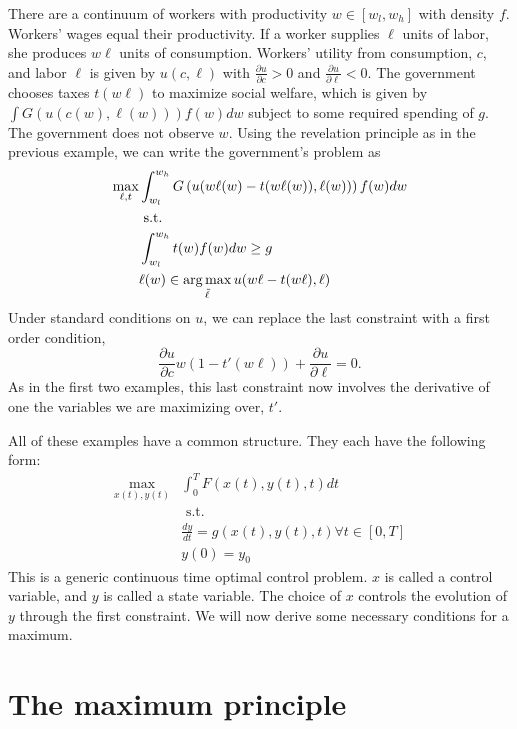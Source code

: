 \begin{example}
  There are a continuum of workers with productivity $w \in [w_l,w_h]$
  with density $f$. Workers' wages equal their productivity. If a
  worker supplies $\ell$ units of labor, she produces $w \ell$ units
  of consumption. Workers' utility from consumption, $c$, and labor
  $\ell$ is given by $u(c,\ell)$ with $\frac{\partial u}{\partial c} >
  0$ and $\frac{\partial u}{\partial \ell} < 0$. The government
  chooses taxes $t(w\ell)$ to maximize social welfare, which is given
  by $\int G(u(c(w),\ell(w))) f(w) dw$ subject to some required
  spending of $g$. The government does
  not observe $w$. Using the revelation principle as in the previous
  example, we can write the government's problem as
  \begin{align*}
    \max_{\ell,t} &  \int_{w_l}^{w_h} G\left(u(w\ell(w) - t(w\ell(w)),\ell(w))
    \right) f(w) dw \\
    & \text{ s.t. } \\
    & \int_{w_l}^{w_h} t(w) f(w) dw \geq g \\
    & \ell(w) \in \argmax_{\tilde{\ell}} u(w\ell - t(w\ell), \ell )
  \end{align*}  
  Under standard conditions on $u$, we can replace the last constraint
  with a first order condition,
  \[ \frac{\partial u}{\partial c} w\left(1 - t'(w\ell)\right) +
  \frac{\partial u}{\partial \ell} = 0. \]
  As in the first two examples, this last constraint now involves the
  derivative of one the variables we are maximizing over, $t'$.
\end{example}

All of these examples have a common structure. They each have the
following form:
\begin{align*}
  \max_{x(t),y(t)} & \int_0^T F(x(t),y(t),t) dt \\
  & \text{ s.t.} \\
  & \frac{d y}{dt} = g(x(t),y(t),t) \forall t \in [0,T] \\ 
  & y(0) = y_0
\end{align*}
This is a generic continuous time optimal control problem. 
$x$ is called a control variable, and $y$ is called a state
variable. The choice of $x$ controls the evolution of $y$ through the
first constraint. We will now derive some necessary conditions for a
maximum. 

\section{The maximum principle \label{sec:maxprin}}


